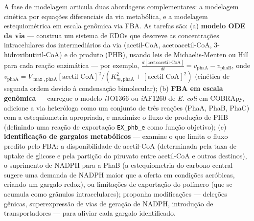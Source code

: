 \begin{exercicio}
A fase de modelagem articula duas abordagens complementares: a modelagem cinética por equações diferenciais da via metabólica, e a modelagem estequiométrica em escala genômica via FBA. As tarefas são: (a) \textbf{modelo ODE da via} --- construa um sistema de EDOs que descreve as concentrações intracelulares dos intermediários da via (acetil-CoA, acetoacetil-CoA, 3-hidroxibutiril-CoA) e do produto (PHB), usando leis de Michaelis-Menten ou Hill para cada reação enzimática --- por exemplo, $\frac{d[\text{acetoacetil-CoA}]}{dt} = v_{\text{phaA}} - v_{\text{phaB}}$, onde $v_{\text{phaA}} = V_{\max,\text{phaA}} [\text{acetil-CoA}]^2 / (K_{m,\text{phaA}}^2 + [\text{acetil-CoA}]^2)$ (cinética de segunda ordem devido à condensação bimolecular); (b) \textbf{FBA em escala genômica} --- carregue o modelo \textit{i}JO1366 ou \textit{i}AF1260 de \textit{E. coli} em COBRApy, adicione a via heteróloga como um conjunto de três reações (PhaA, PhaB, PhaC) com a estequiometria apropriada, e maximize o fluxo de produção de PHB (definindo uma reação de exportação \texttt{EX\_phb\_e} como função objetivo); (c) \textbf{identificação de gargalos metabólicos} --- examine o que limita o fluxo predito pelo FBA: a disponibilidade de acetil-CoA (determinada pela taxa de uptake de glicose e pela partição do piruvato entre acetil-CoA e outros destinos), o suprimento de NADPH para a PhaB (a estequiometria do carbono central sugere uma demanda de NADPH maior que a oferta em condições aeróbicas, criando um gargalo redox), ou limitações de exportação do polímero (que se acumula como grânulos intracelulares); proponha modificações --- deleções gênicas, superexpressão de vias de geração de NADPH, introdução de transportadores --- para aliviar cada gargalo identificado.
\end{exercicio}


